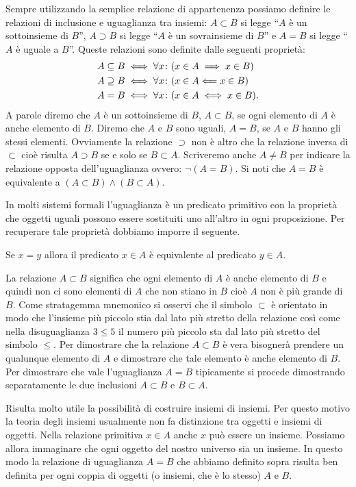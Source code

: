 Sempre utilizzando la semplice relazione di appartenenza possiamo definire
le relazioni di inclusione e uguaglianza tra insiemi:
$A \subset B$ si legge ``$A$ è un sottoinsieme di $B$'',
$A \supset B$ si legge ``$A$ è un sovrainsieme di $B$''
e $A=B$ si legge ``$A$ è uguale a $B$''. 
Queste relazioni sono definite dalle seguenti proprietà:
\begin{align*}
  A \subseteq B &\iff \forall x\colon (x\in A \implies x\in B)\\
  A \supseteq B &\iff \forall x\colon (x\in A \Longleftarrow x\in B)\\
  A = B &\iff \forall x\colon (x\in A \iff x \in B).
\end{align*}
A parole diremo che $A$ è un sottoinsieme di $B$, 
$A \subset B$, se ogni elemento di $A$ è anche elemento di $B$.
Diremo che $A$ e $B$ sono uguali, $A=B$, 
se $A$ e $B$ hanno gli stessi elementi.
Ovviamente la relazione $\supset$ non è altro 
che la relazione inversa di $\subset$ cioè risulta 
$A\supset B$ se e solo se $B\subset A$.
Scriveremo anche $A \neq B$ per indicare
la relazione opposta dell'uguaglianza ovvero: $\lnot(A=B)$.
Si noti che $A=B$ è equivalente a $(A\subset B) \land (B\subset A)$.

In molti sistemi formali l'uguaglianza è un predicato primitivo con la 
proprietà che oggetti uguali possono essere sostituiti uno all'altro 
in ogni proposizione. Per recuperare tale proprietà 
dobbiamo imporre il seguente.

\begin{axiom}[estensionalità]
Se $x=y$ allora il predicato $x\in A$ è equivalente 
al predicato $y\in A$.
\end{axiom}

La relazione $A \subset B$ significa che ogni elemento di $A$ 
è anche elemento di $B$ e quindi non ci sono elementi di $A$ che non stiano 
in $B$ cioè $A$ non è più grande di $B$. 
Come stratagemma mnemonico si osservi che il simbolo 
$\subset$ è orientato in modo che l'insieme più piccolo 
stia dal lato più stretto della relazione così come 
nella disuguaglianza $3 \le 5$ il numero più piccolo 
sta dal lato più stretto del simbolo $\le$.
Per dimostrare che la relazione $A \subset B$ è vera 
bisognerà prendere un qualunque elemento di $A$ e dimostrare 
che tale elemento è anche elemento di $B$.
Per dimostrare che vale l'uguaglianza $A=B$ tipicamente si procede 
dimostrando separatamente le due inclusioni $A\subset B$ e $B\subset A$.

Risulta molto utile la possibilità di costruire insiemi di insiemi.
Per questo motivo la teoria degli insiemi usualmente non fa distinzione
tra oggetti e insiemi di oggetti. Nella relazione primitiva $x\in A$ anche
$x$ può essere un insieme. Possiamo allora immaginare che ogni oggetto del
nostro universo sia un insieme. In questo modo la relazione di uguaglianza $A=B$
che abbiamo definito sopra risulta ben definita per ogni coppia di oggetti
(o insiemi, che è lo stesso) $A$ e $B$.

